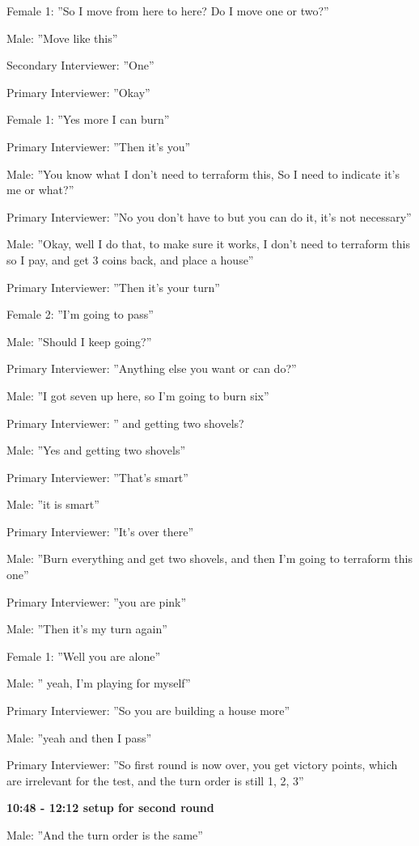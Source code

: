 Female 1: ”So I move from here to here? Do I move one or two?”

Male: ”Move like this”

Secondary Interviewer: ”One”

Primary Interviewer: ”Okay”

Female 1: ”Yes more I can burn”

Primary Interviewer: ”Then it’s you”

Male: ”You know what I don’t need to terraform this, So I need to indicate it’s me or what?”

Primary Interviewer: ”No you don’t have to but you can do it, it’s not necessary”

Male: ”Okay, well I do that, to make sure it works, I don’t need to terraform this so I pay, and get 3 coins back, and place a house”

Primary Interviewer: ”Then it’s your turn”

Female 2: ”I’m going to pass”

Male: ”Should I keep going?”

Primary Interviewer: ”Anything else you want or can do?”

Male: ”I got seven up here, so I’m going to burn six”

Primary Interviewer: ” and getting two shovels?

Male: ”Yes and getting two shovels”

Primary Interviewer: ”That’s smart”

Male: ”it is smart”

Primary Interviewer: ”It’s over there”

Male: ”Burn everything and get two shovels, and then I’m going to terraform this one”

Primary Interviewer: ”you are pink”

Male: ”Then it’s my turn again”

Female 1: ”Well you are alone”

Male: ” yeah, I’m playing for myself”

Primary Interviewer: ”So you are building a house more”

Male: ”yeah and then I pass”

Primary Interviewer: ”So first round is now over, you get victory points, which are irrelevant for the test, and the turn order is still 1, 2, 3”

\textbf{10:48 - 12:12 setup for second round}

Male: ”And the turn order is the same”

